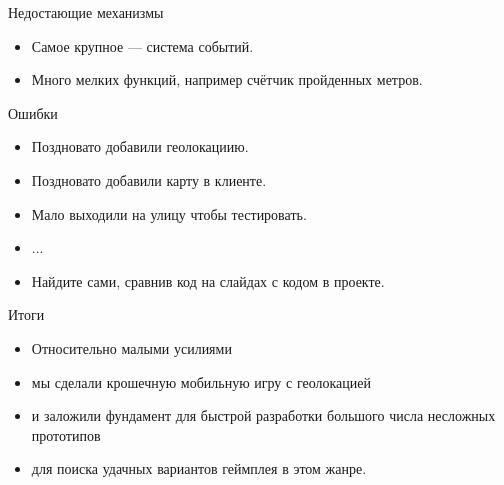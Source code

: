 \documentclass[aspectratio=169,handout,bigger]{beamer}
\begin{document}

\begin{frame}{Недостающие механизмы}
  \begin{itemize}
    \item Самое крупное --- система событий.
    \item Много мелких функций, например счётчик пройденных метров.
  \end{itemize}
\end{frame}


\begin{frame}{Ошибки}
  \begin{itemize}
    \item Поздновато добавили геолокациию.
    \item Поздновато добавили карту в клиенте.
    \item Мало выходили на улицу чтобы тестировать.
    \item ...
    \item Найдите сами, сравнив код на слайдах с кодом в проекте.
  \end{itemize}
\end{frame}


\begin{frame}{Итоги}
  \begin{itemize}
    \item Относительно малыми усилиями
    \item мы сделали крошечную мобильную игру с геолокацией
    \item и заложили фундамент для быстрой разработки большого числа
          несложных прототипов
    \item для поиска удачных вариантов геймплея в этом жанре.
  \end{itemize}
\end{frame}

\end{document}
